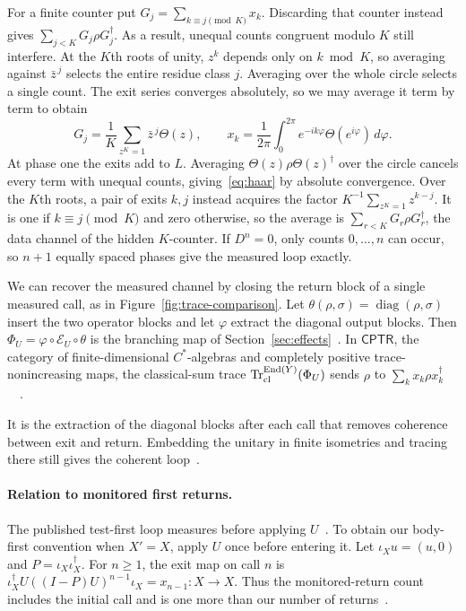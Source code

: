 \documentclass[acmsmall,screen,review,anonymous,nonacm]{acmart}
\DeclareMathOperator{\Tr}{Tr}
\numberwithin{equation}{section}
\newcommand{\chan}[1]{\mathcal E_{#1}}
\begin{document}
For a finite counter put $G_j=\sum_{k\equiv
j\pmod K}x_k$. Discarding that counter instead gives
$\sum_{j<K}G_j\rho G_j^\dagger$. As a result, unequal counts
congruent modulo $K$ still interfere. At the $K$th roots of unity, $z^k$ depends only on $k\bmod K$,
so averaging against $\bar z^{\,j}$ selects the entire residue class $j$. Averaging over
the whole circle selects a single count. The exit series converges absolutely, so we may average it term by term to obtain
\[
G_j=\frac1K\sum_{z^K=1}\bar z^{\,j}\Theta(z),\qquad
x_k=\frac1{2\pi}\int_0^{2\pi}
e^{-ik\varphi}\Theta(e^{i\varphi})\,d\varphi .
\]
At phase one the exits add to $L$. Averaging
$\Theta(z)\rho\Theta(z)^\dagger$ over the circle cancels every term with
unequal counts, giving~\eqref{eq:haar} by absolute convergence. Over the
$K$th roots, a pair of exits $k,j$ instead acquires the factor
$K^{-1}\sum_{z^K=1}z^{k-j}$. It is one if $k\equiv j\pmod K$ and zero
otherwise, so the average is $\sum_{r<K}G_r\rho G_r^\dagger$, the
data channel of the hidden $K$-counter.
If $D^n=0$, only counts $0,\ldots,n$ can occur, so $n+1$ equally spaced
phases give the measured loop exactly.

We can recover the measured channel by closing the return block of a single
measured call, as in Figure~\ref{fig:trace-comparison}. Let
$\theta(\rho,\sigma)=\operatorname{diag}(\rho,\sigma)$ insert the
two operator blocks and let $\varphi$ extract the diagonal output
blocks. Then $\Phi_U=\varphi\circ\chan U\circ\theta$ is the branching
map of Section~\ref{sec:effects}~\cite[Def.~3.3.18]{AndresMartinez22Thesis}.
In $\mathsf{CPTR}$, the category of finite-dimensional $C^*$-algebras and
completely positive trace-nonincreasing maps, the classical-sum trace
$\Tr^{\operatorname{End}(Y)}_{\rm cl}(\Phi_U)$ sends $\rho$ to
$\sum_k x_k\rho x_k^\dagger$~\cite[\S~5.1, Eq.~(1)]{Selinger04QPL}~\cite[Thm.~3.2.11, Prop.~3.2.17]{AndresMartinez22Thesis}.

It is the extraction of the diagonal blocks after each call that removes
coherence between exit and return. Embedding the unitary in finite
isometries and tracing there still gives the coherent loop~\cite[Cor.~3.3.16]{AndresMartinez22Thesis}.

\paragraph{Relation to monitored first returns.}
The published test-first loop measures before applying
$U$~\cite[\S~3]{YingFeng10QuantumLoop}. To obtain our body-first
convention when $X'=X$, apply $U$ once before entering it. Let
$\iota_Xu=(u,0)$ and $P=\iota_X\iota_X^\dagger$. For $n\ge1$, the
exit map on call $n$ is
$\iota_X^\dagger U((I-P)U)^{n-1}\iota_X=x_{n-1}:X\to X$. Thus the
monitored-return count includes the initial call and is one more than
our number of returns~\cite[\S~2]{Bourgain14Subspace}.
\end{document}

